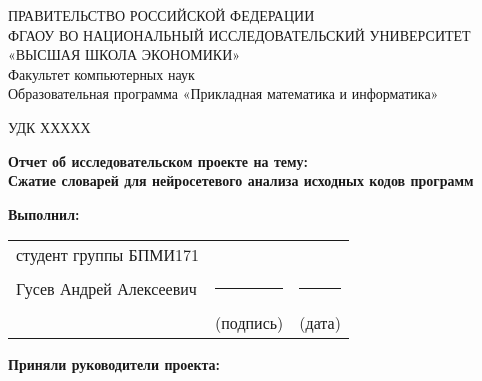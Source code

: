 \begin{titlepage}
\newpage

{
\begin{center}
ПРАВИТЕЛЬСТВО РОССИЙСКОЙ ФЕДЕРАЦИИ\\
ФГАОУ ВО НАЦИОНАЛЬНЫЙ ИССЛЕДОВАТЕЛЬСКИЙ УНИВЕРСИТЕТ\\
«ВЫСШАЯ ШКОЛА ЭКОНОМИКИ»
\\
\bigskip
Факультет компьютерных наук\\
Образовательная программа «Прикладная математика и информатика»
\end{center}
}

\vspace{2em}
УДК ХХХХХ
\vspace{5em}

\begin{center}
{\bf Отчет об исследовательском проекте на тему:}\\
{\bf Сжатие словарей для нейросетевого анализа исходных кодов программ}
\end{center}

\vspace{2em}

{\bf Выполнил: \vspace{2mm}}

{
\begin{tabular}{l@{\hskip 1.5cm}c@{\hskip 1.5cm}c}
студент группы БПМИ171 & & \\
Гусев Андрей Алексеевич & \rule{3.5cm}{0.15mm}  &  \rule{3.5cm}{0.15mm} \vspace{-2mm} \\
 & \tiny{(подпись)}  & \tiny{(дата)} \\
\end{tabular}}

\vspace{1em}
{\bf Приняли руководители проекта: \vspace{2mm}}


\end{titlepage}
